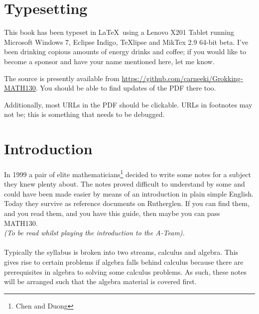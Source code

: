 \section{Typesetting}
This book has been typeset in \LaTeX~using a Lenovo X201 Tablet running
Microsoft Windows 7, Eclipse Indigo, TeXlipse and MikTex 2.9 64-bit beta. I've
been drinking copious amounts of energy drinks and coffee; if you would like to
become a sponsor and have your name mentioned here, let me know.

The source is presently available from
\url{https://github.com/carneeki/Grokking-MATH130}. You should be able to find
updates of the PDF there too.

Additionally, most URLs in the PDF should be clickable. URLs in footnotes may
not be; this is something that needs to be debugged.

\section{Introduction}
\label{sec:Introduction}
In 1999 a pair of elite mathematicians\footnote{Chen and Duong} decided to
write some notes for a subject they knew plenty about. The notes proved
difficult to understand by some and could have been made easier by means of an
introduction in plain simple English. Today they survive as reference documents
on Rutherglen. If you can find them, and you read them, and you have this
guide, then maybe you can pass MATH130.\\
\emph{(To be read whilst playing the introduction to the A-Team).}\\
\\
Typically the syllabus is broken into two streams, calculus and algebra. This
gives rise to certain problems if algebra falls behind calculus because
there are prerequisites in algebra to solving some calculus problems. As such,
these notes will be arranged such that the algebra material is covered first.
